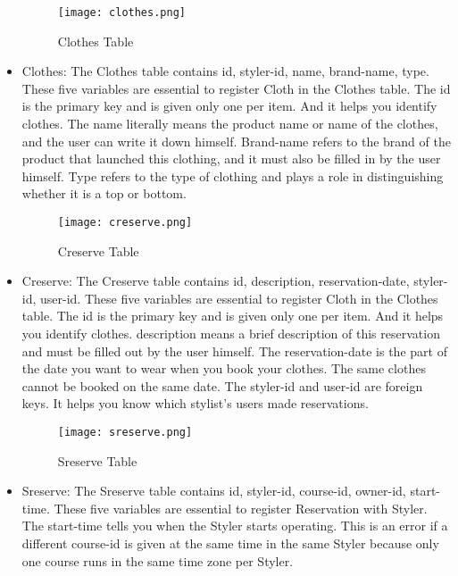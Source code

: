 \documentclass[conference]{IEEEtran}
\begin{document}
\begin{itemize}
    \begin{figure}[htbp]
    \centerline{\texttt{[image: clothes.png]}}
    \label{fig}
    \caption{Clothes Table}
    \end{figure}
    \item Clothes: The Clothes table contains id, styler-id, name, brand-name, type. These five variables are essential to register Cloth in the Clothes table. The id is the primary key and is given only one per item. And it helps you identify clothes. The name literally means the product name or name of the clothes, and the user can write it down himself. Brand-name refers to the brand of the product that launched this clothing, and it must also be filled in by the user himself. Type refers to the type of clothing and plays a role in distinguishing whether it is a top or bottom.\\

    \begin{figure}[htbp]
    \centerline{\texttt{[image: creserve.png]}}
    \label{fig}
    \caption{Creserve Table}
    \end{figure}
    \item Creserve: The Creserve table contains id, description, reservation-date, styler-id, user-id. These five variables are essential to register Cloth in the Clothes table. The id is the primary key and is given only one per item. And it helps you identify clothes. description means a brief description of this reservation and must be filled out by the user himself. The reservation-date is the part of the date you want to wear when you book your clothes. The same clothes cannot be booked on the same date. The styler-id and user-id are foreign keys. It helps you know which stylist's users made reservations.\\
    
    \begin{figure}[htbp]
    \centerline{\texttt{[image: sreserve.png]}}
    \label{fig}
    \caption{Sreserve Table}
    \end{figure}
    \item Sreserve: The Sreserve table contains id, styler-id, course-id, owner-id, start-time. These five variables are essential to register Reservation with Styler. The start-time tells you when the Styler starts operating. This is an error if a different course-id is given at the same time in the same Styler because only one course runs in the same time zone per Styler.\\
    

\end{itemize}
\end{document}
